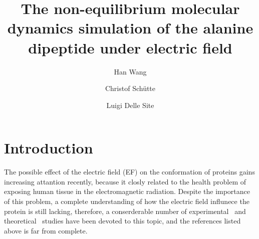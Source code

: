 \documentclass[aip,jcp,a4paper,preprint,onecolumn]{revtex4-1}
\begin{document}
\title{The non-equilibrium molecular dynamics simulation of the alanine dipeptide under electric field}
\author{Han Wang}
\author{Christof Sch\"utte}
\author{Luigi Delle Site}

\begin{abstract}
\end{abstract}

\maketitle


\section{Introduction}


The possible effect of the electric field (EF) on the conformation of
proteins gains increasing attantion recently, because it closly
related to the health problem of exposing human tissue in the
electromagnetic radiation. Despite the importance of this problem, a
complete understanding of how the electric field influnece the  protein
is still lacking, therefore, a conserderable number of
experimental~\cite{bohr2000microwave, bohr2000microwave-1,
  dePomerai2000cell, inskip2001cellular, mancinelli2004non} and
theoretical~\cite{budi2005electric, budi2007effect,
  budi2008comparative, toschi2008effects, astrakas2011electric,
  astrakas2012structural, damm2012can, starzyk2013proteins,
  english2009nonequilibrium, solomentsev2012effects} studies have been devoted to this topic,
and the references listed above is far from complete.
\end{document}
